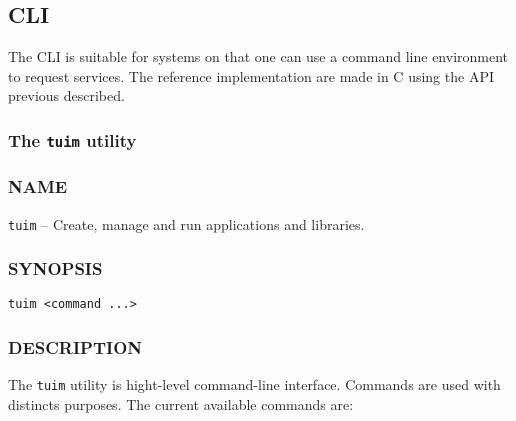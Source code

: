 \subsection{CLI}

The CLI is suitable for systems on that one can
use a command line environment to request services.
The reference implementation are made in C using the API previous described.

\subsubsection{The \texttt{tuim} utility}

\subsubsection*{NAME}

\noindent
\texttt{tuim} -- Create, manage and run applications and libraries.

\subsubsection*{SYNOPSIS}

\begin{lstlisting}[style=bash]
tuim <command ...>
\end{lstlisting}

\subsubsection*{DESCRIPTION}

The \texttt{tuim} utility is hight-level command-line interface.
Commands are used with distincts purposes. The current available commands are:

